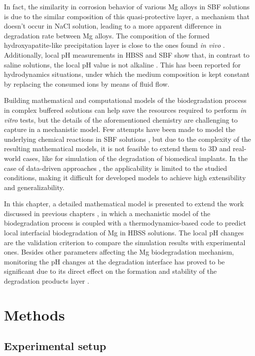 In fact, the similarity in corrosion behavior of various Mg alloys in \gls{SBF} solutions is due to the similar composition of this quasi-protective layer, a mechanism that doesn't occur in NaCl solution, leading to a more apparent difference in degradation rate between Mg alloys. The composition of the formed hydroxyapatite-like precipitation layer is close to the ones found \textit{in vivo} \cite{Mei2020}. Additionally, local pH measurements in \gls{HBSS} and \gls{SBF} show that, in contrast to saline solutions, the local pH value is not alkaline \cite{Lamaka2018,Mei2021}. This has been reported for hydrodynamics situations, under which the medium composition is kept constant by replacing the consumed ions by means of fluid flow.

Building mathematical and computational models of the biodegradation process in complex buffered solutions can help save the resources required to perform \textit{in vitro} tests, but the details of the aforementioned chemistry are challenging to capture in a mechanistic model. Few attempts have been made to model the underlying chemical reactions in \gls{SBF} solutions \cite{Hoche2014,Dolgikh2019,Zeller-Plumhoff2022}, but due to the complexity of the resulting mathematical models, it is not feasible to extend them to 3D and real-world cases, like for simulation of the degradation of biomedical implants. In the case of data-driven approaches \cite{Zeller-Plumhoff2021}, the applicability is limited to the studied conditions, making it difficult for developed models to achieve high extensibility and generalizability. 

In this chapter, a detailed mathematical model is presented to extend the work discussed in previous chapters \cite{Barzegari2021}, in which a mechanistic model of the biodegradation process is coupled with a thermodynamics-based code to predict local interfacial biodegradation of Mg in \gls{HBSS} solutions. The local pH changes are the validation criterion to compare the simulation results with experimental ones. Besides other parameters affecting the Mg biodegradation mechanism, monitoring the pH changes at the degradation interface has proved to be significant due to its direct effect on the formation and stability of the degradation products layer \cite{Gonzalez2021}.


\section{Methods}

\subsection{Experimental setup}

